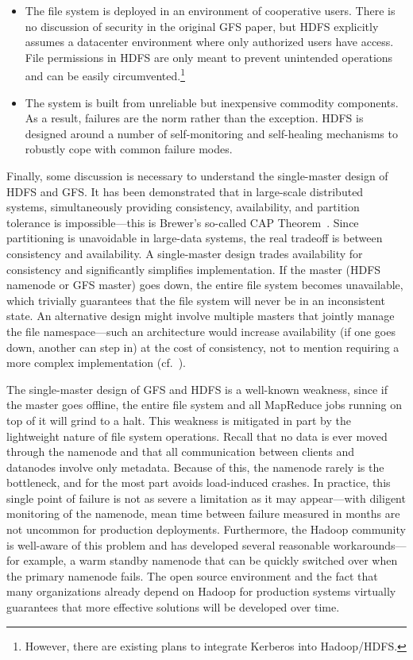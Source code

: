\begin{itemize}
\item The file system is deployed in an environment of cooperative
  users.  There is no discussion of security in the original GFS
  paper, but HDFS explicitly assumes a datacenter environment where
  only authorized users have access.  File permissions in HDFS are
  only meant to prevent unintended operations and can be easily
  circumvented.\footnote{However, there are existing plans to
  integrate Kerberos into Hadoop/HDFS.}

\item The system is built from unreliable but inexpensive commodity
  components.  As a result, failures are the norm rather than the
  exception.  HDFS is designed around a number of self-monitoring and
  self-healing mechanisms to robustly cope with common failure modes.

\end{itemize}

\noindent Finally, some discussion is necessary to understand the
single-master design of HDFS and GFS.  It has been demonstrated that
in large-scale distributed systems, simultaneously providing
consistency, availability, and partition tolerance is
impossible---this is Brewer's so-called CAP
Theorem~\cite{Gilbert_Lynch_2002}.  Since partitioning is unavoidable
in large-data systems, the real tradeoff is between consistency and
availability.  A single-master design trades availability for
consistency and significantly simplifies implementation.  If the
master (HDFS namenode or GFS master) goes down, the entire file system
becomes unavailable, which trivially guarantees that the file system
will never be in an inconsistent state.  An alternative design might
involve multiple masters that jointly manage the file namespace---such
an architecture would increase availability (if one goes down, another
can step in) at the cost of consistency, not to mention requiring a
more complex implementation
(cf.~\cite{Alvaro_etal_2009,McKusick_Quinlan_2009}).

The single-master design of GFS and HDFS is a well-known weakness,
since if the master goes offline, the entire file system and all
MapReduce jobs running on top of it will grind to a halt.  This
weakness is mitigated in part by the lightweight nature of file system
operations.  Recall that no data is ever moved through the namenode
and that all communication between clients and datanodes involve only
metadata.  Because of this, the namenode rarely is the bottleneck, and
for the most part avoids load-induced crashes.  In practice, this
single point of failure is not as severe a limitation as it may
appear---with diligent monitoring of the namenode, mean time between
failure measured in months are not uncommon for production
deployments.  Furthermore, the Hadoop community is well-aware of this
problem and has developed several reasonable workarounds---for
example, a warm standby namenode that can be quickly switched over
when the primary namenode fails.  The open source environment and the
fact that many organizations already depend on Hadoop for production
systems virtually guarantees that more effective solutions will be
developed over time.

